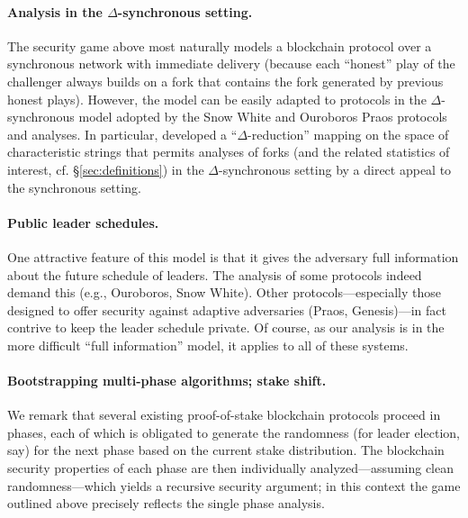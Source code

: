 \paragraph{Analysis in the $\Delta$-synchronous setting.} The security
game above most naturally models a blockchain protocol over a
synchronous network with immediate delivery (because each ``honest''
play of the challenger always builds on a fork that contains the fork
generated by previous honest plays). However, the model can be easily
adapted to protocols in the $\Delta$-synchronous model adopted by
the Snow White and Ouroboros Praos protocols and analyses. In
particular, \citet{DBLP:conf/eurocrypt/DavidGKR18} developed a
``$\Delta$-reduction'' mapping on the space of characteristic strings
that permits analyses of forks (and the related statistics of
interest, cf. \S\ref{sec:definitions}) in the $\Delta$-synchronous
setting by a direct appeal to the synchronous setting.

\paragraph{Public leader schedules.} One attractive feature of this
model is that it gives the adversary full information about the future
schedule of leaders. The analysis of some protocols indeed demand this
(e.g., Ouroboros, Snow White). Other protocols---especially those
designed to offer security against adaptive adversaries (Praos,
Genesis)---in fact contrive to keep the leader schedule private. Of
course, as our analysis is in the more difficult ``full information''
model, it applies to all of these systems.

\paragraph{Bootstrapping multi-phase algorithms; stake shift.} We remark that
several existing proof-of-stake blockchain protocols proceed in
phases, each of which is obligated to generate the randomness (for
leader election, say) for the next phase based on the current stake
distribution. The blockchain security properties of each phase are
then individually analyzed---assuming clean randomness---which yields
a recursive security argument; in this context the game outlined above
precisely reflects the single phase analysis.

